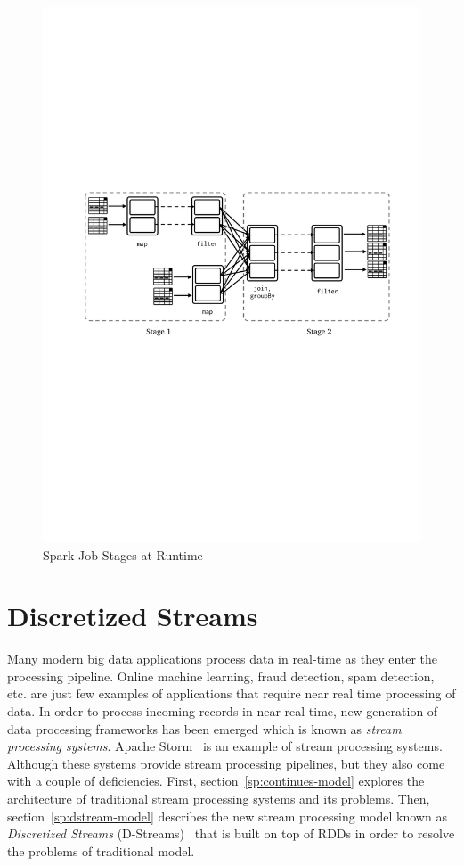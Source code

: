 \begin{figure}[h!]
    \includegraphics[clip,trim=2.3cm 11.4cm 1.7cm 10cm,scale=0.97]{stage-dag.pdf}
    \caption[Spark Job Stages at Runtime]{Spark Job Stages at Runtime}
    \label{fig:sp:dag}
\end{figure}

\clearpage
\section{Discretized Streams}
\label{sp:dstream}

Many modern big data applications process data in real-time as they enter the processing pipeline. Online machine learning, fraud detection, spam detection, etc. are just few examples of applications that require near real time processing of data. In order to process incoming records in near real-time, new generation of data processing frameworks has been emerged which is known as \emph{stream processing systems}. Apache Storm~\cite{Storm} is an example of stream processing systems. Although these systems provide stream processing pipelines, but they also come with a couple of deficiencies. First, section~\ref{sp:continues-model} explores the architecture of traditional stream processing systems and its problems. Then, section~\ref{sp:dstream-model} describes the new stream processing model known as \emph{Discretized Streams} (D-Streams)~\cite{Zaharia:2013} that is built on top of RDDs in order to resolve the problems of traditional model.

